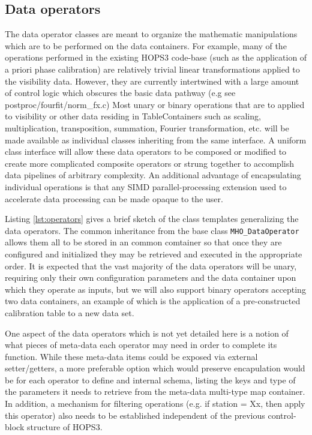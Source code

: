 \documentclass[hidelinks]{article}
\let\Oldsubsection\subsection
\renewcommand{\subsection}{\FloatBarrier\Oldsubsection}
\begin{document}
\subsection{Data operators}

The data operator classes are meant to organize the mathematic manipulations which are to be performed on the data containers. For example, many of the operations performed in the existing HOPS3 code-base (such as the application of a priori phase calibration) are relatively trivial linear transformations applied to the visibility data. However, they are currently intertwined with a large amount of control logic which obscures the basic data pathway (e.g see postproc/fourfit/norm\_fx.c)
Most unary or binary operations that are to applied to visibility or other data residing in TableContainers such as scaling, multiplication, transposition, summation, Fourier transformation, etc. will be made available as individual classes inheriting from the same interface. A uniform class interface will allow these data operators to be composed or modified to create more complicated composite operators or strung together to accomplish data pipelines of arbitrary complexity. An additional advantage of encapsulating individual operations is that any SIMD parallel-processing extension used to accelerate data processing can be made opaque to the user.

Listing \ref{lst:operators} gives a brief sketch of the class templates generalizing the data operators. The common inheritance from the base class \texttt{MHO\_DataOperator} allows them all to be stored in an common comtainer so that once they are configured and initialized they may be retrieved
and executed in the appropriate order. It is expected that the vast majority of the data operators will be unary, requiring only their own configuration 
parameters and the data container upon which they operate as inputs, but we will also support binary operators accepting two data containers, an example
of which is the application of a pre-constructed calibration table to a new data set.

One aspect of the data operators which is not yet detailed here is a notion of what pieces of meta-data each operator may need in order to complete its function.
While these meta-data items could be exposed via external setter/getters, a more preferable option which would preserve encapulation would be for each operator
to define and internal schema, listing the keys and type of the parameters it needs to retrieve from the meta-data multi-type map container. 
In addition, a mechanism for filtering operations (e.g. if station = Xx, then apply this operator) also needs to be established independent of the
previous control-block structure of HOPS3.
\end{document}
